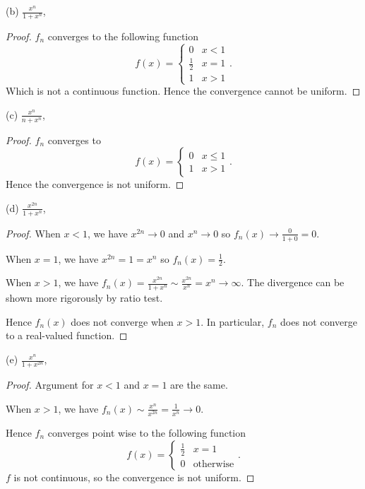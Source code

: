 \begin{itemize}
(b) $\frac{x^n}{1+x^n}$,
\begin{proof}
	$f_n$ converges to the following function
	\[
		f(x) = \begin{cases}
			0 & x < 1\\
			\frac{1}{2} & x = 1 \\
			1 & x > 1
		\end{cases}
	.\] 
	Which is not a continuous function. Hence the convergence cannot be uniform.
\end{proof}

(c) $\frac{x^n}{n+x^n}$,
 \begin{proof}
	$f_n$ converges to 
	\[
		f(x) = \begin{cases}
			0 & x \le 1\\
			1 & x >1
		\end{cases}
	.\] 
	Hence the convergence is not uniform.
\end{proof}

(d) $\frac{x^{2 n}}{1+x^n}$,
\begin{proof}
	When  $x<1$, we have $x^{2n} \to 0$ and $x^n \to 0$ so $f_n(x) \to \frac{0}{1+0} = 0$.
	
	When $x = 1$, we have $x^{2n} = 1 = x^n$ so $f_n(x) = \frac{1}{2}$.

	When $x>1$, we have $f_n(x) = \frac{x^{2n}}{1+x^n} \sim \frac{x^{2n}}{x^n} = x^n \to  \infty $. The divergence can be shown more rigorously by ratio test.

	Hence $f_n(x)$ does not converge when $x > 1$. In particular, $f_n$ does not converge to a real-valued function.
\end{proof}

(e) $\frac{x^n}{1+x^{2 n}}$,
\begin{proof}
	Argument for $x<1$ and $x=1$ are the same.

	When $x>1$, we have $f_n(x) \sim \frac{x^n}{x^{2n}} = \frac{1}{x^n} \to 0$.

	Hence $f_n$ converges point wise to the following function
	\[
		f(x) = \begin{cases}
			\frac{1}{2} & x = 1 \\
			0 & \text{otherwise}
		\end{cases}
	.\] 
	$f$ is not continuous, so the convergence is not uniform.
\end{proof}


\end{itemize}
